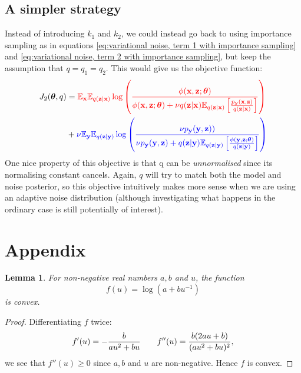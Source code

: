 \documentclass[11pt, oneside]{article}
\newcommand{\thetab}{{\boldsymbol{\theta}}}
\newcommand{\pnn}{\phi}
\newcommand{\pnoise}{p_{ \mathbf y}}
\newcommand{\x}{{\mathbf x}}
\newcommand{\y}{{\mathbf y}}
\newcommand{\z}{{\mathbf z}}
\newcommand{\E}{\mathbb{E}}
\newcommand{\Ex}{\E_{\x}}
\newcommand{\Ey}{\E_{\y}}
\newtheorem{lemma}[theorem]{Lemma}
\theoremstyle{definition}
\begin{document}
{\subsection{A simpler strategy}
Instead of introducing $k_1$ and $k_2$, we could instead go back to using importance sampling as in equations \ref{eq:variational noise, term 1 with importance sampling} and \ref{eq:variational noise, term 2 with importance sampling}, but keep the assumption that $q = q_1 = q_2$. This would give us the objective function: 
\begin{align}
\label{eq:variational noise objective function with importance sampling}
    J_2(\thetab, q) &= \color{red}{\Ex \mathbb{E}_{q(\z | \x)} \log \left( \frac{\pnn(\x,\z; \thetab)}{\pnn(\x,\z; \thetab) + \nu q(\z | \x) \mathbb{E}_{q(\z | \x)} \left[ \frac{\pnoise(\x, \z)}{q(\z | \x)} \right]} \right)} \\
    &+ \color{blue}{ \nu \Ey \mathbb{E}_{q(\z | \y)} \log \left( \frac{\nu \pnoise(\y, \z))}{\nu \pnoise(\y, \z) +  q(\z | \y)\mathbb{E}_{q(\z | \y)}\left[ \frac{\pnn(\y , \z; \thetab)}{q(\z | \y)} \right] } \right)}
\end{align}
One nice property of this objective is that q can be \emph{unnormalised} since its normalising constant cancels. Again, $q$ will try to match both the model and noise posterior, so this objective intuitively makes more sense when we are using an adaptive noise distribution (although investigating what happens in the ordinary case is still potentially of interest).




\newpage
\section{Appendix}

\begin{lemma}
\label{lemma: f convex}
For non-negative real numbers $a, b$ and $u$, the function 
\begin{equation}
    f(u) = \log(a + bu^{-1})
\end{equation}
is convex.
\end{lemma}
\begin{proof}
Differentiating $f$ twice:
    \begin{align}
        f'(u) = - \frac{b}{au^2 + bu} \hspace{7mm} f''(u) = \frac{b(2au + b)}{(au^2 + bu)^2},
    \end{align}
we see that $f''(u) \geq 0$ since $a, b$ and $u$ are non-negative. Hence $f$ is convex.
\end{proof}

}
\end{document}
